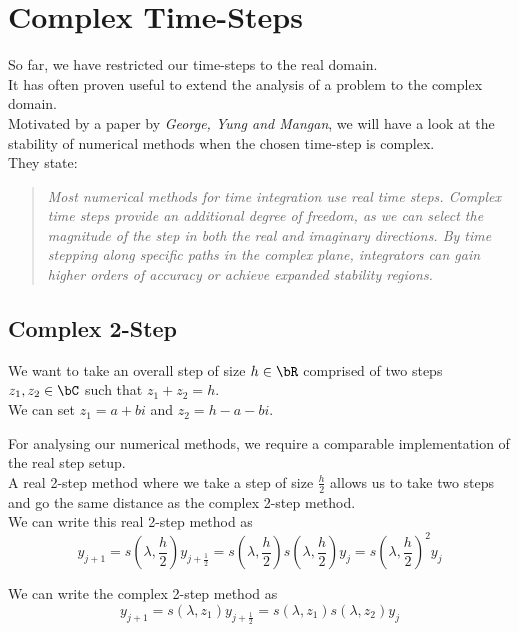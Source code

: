 \section{Complex Time-Steps}
So far, we have restricted our time-steps to the real domain.\\
It has often proven useful to extend the analysis of a problem to the complex domain.\\
Motivated by a paper by \textit{George, Yung and Mangan}\cite{walking_into_the_complex_domain}, we will have a look at the stability of numerical methods when the chosen time-step is complex.\\
They state: \begin{quote} \textit {Most numerical methods for time integration use real time steps. Complex time steps provide an additional degree of freedom, as we can select the magnitude of the step in both the real and imaginary directions. By time stepping along specific paths in the complex plane, integrators can gain higher orders of accuracy or achieve expanded stability regions.}\end{quote}

\subsection{Complex 2-Step}
\begin{multicols}{2}
\par We want to take an overall step of size $h \in \bR$ comprised of two steps $z_1, z_2 \in \bC$ such that $z_1 + z_2 = h$.\\
We can set $z_1 = a + bi$ and $z_2 = h - a - bi$.\\

\par For analysing our numerical methods, we require a comparable implementation of the real step setup.\\
A real 2-step method where we take a step of size $\frac{h}{2}$ allows us to take two steps and go the same distance as the complex 2-step method.\\
We can write this real 2-step method as
\[y_{j+1} = s(\lambda, \frac{h}{2}) y_{j+\frac{1}{2}} = s(\lambda, \frac{h}{2}) s(\lambda, \frac{h}{2}) y_j = {s(\lambda, \frac{h}{2})}^{2} y_j\]

\par We can write the complex 2-step method as 
\[y_{j+1} = s(\lambda, z_1) y_{j+\frac{1}{2}} = s(\lambda, z_1) s(\lambda, z_2) y_j\]
\vspace*{\fill}
\columnbreak{}
\end{multicols}



